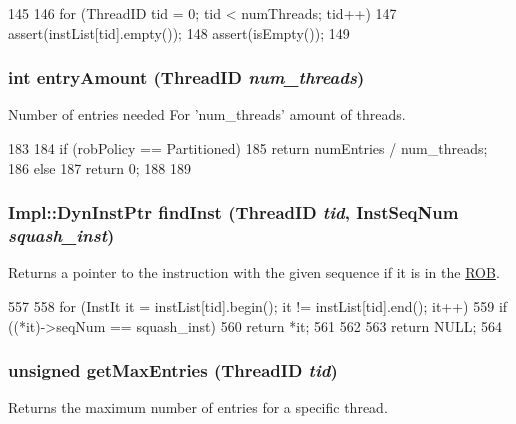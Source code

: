 \begin{DoxyCode}
145 {
146     for (ThreadID tid = 0; tid  < numThreads; tid++)
147         assert(instList[tid].empty());
148     assert(isEmpty());
149 }
\end{DoxyCode}
\hypertarget{classROB_a5d2b0e4e7d98ea4ebd9fb98ac0d91e2f}{
\subsubsection[{entryAmount}]{\setlength{\rightskip}{0pt plus 5cm}int entryAmount ({\bf ThreadID} {\em num\_\-threads})}}
\label{classROB_a5d2b0e4e7d98ea4ebd9fb98ac0d91e2f}
Number of entries needed For 'num\_\-threads' amount of threads. 


\begin{DoxyCode}
183 {
184     if (robPolicy == Partitioned) {
185         return numEntries / num_threads;
186     } else {
187         return 0;
188     }
189 }
\end{DoxyCode}
\hypertarget{classROB_a6b0d3a4acdaebcd1eb294cb58a26be40}{
\subsubsection[{findInst}]{\setlength{\rightskip}{0pt plus 5cm}Impl::DynInstPtr findInst ({\bf ThreadID} {\em tid}, \/  {\bf InstSeqNum} {\em squash\_\-inst})}}
\label{classROB_a6b0d3a4acdaebcd1eb294cb58a26be40}
Returns a pointer to the instruction with the given sequence if it is in the \hyperlink{classROB}{ROB}. 


\begin{DoxyCode}
557 {
558     for (InstIt it = instList[tid].begin(); it != instList[tid].end(); it++) {
559         if ((*it)->seqNum == squash_inst) {
560             return *it;
561         }
562     }
563     return NULL;
564 }
\end{DoxyCode}
\hypertarget{classROB_a9844bb4676b40d12c10f411ffdd4b148}{
\subsubsection[{getMaxEntries}]{\setlength{\rightskip}{0pt plus 5cm}unsigned getMaxEntries ({\bf ThreadID} {\em tid})}}
\label{classROB_a9844bb4676b40d12c10f411ffdd4b148}
Returns the maximum number of entries for a specific thread. 


